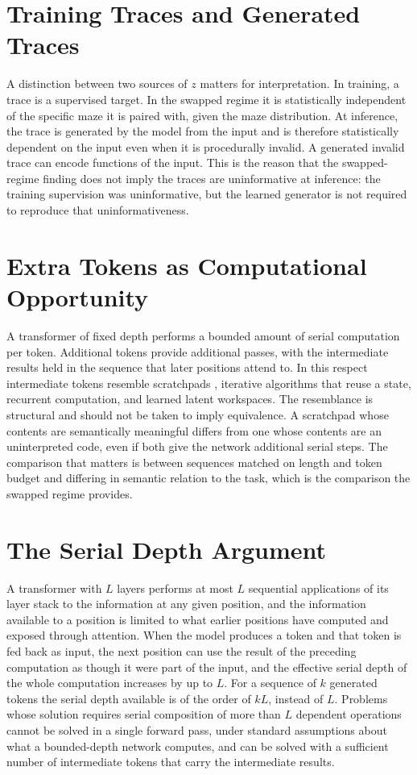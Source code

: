 \section{Training Traces and Generated Traces}

A distinction between two sources of $z$ matters for interpretation. In training, a trace is a supervised target. In the swapped regime it is statistically independent of the specific maze it is paired with, given the maze distribution. At inference, the trace is generated by the model from the input and is therefore statistically dependent on the input even when it is procedurally invalid. A generated invalid trace can encode functions of the input. This is the reason that the swapped-regime finding does not imply the traces are uninformative at inference: the training supervision was uninformative, but the learned generator is not required to reproduce that uninformativeness.

\section{Extra Tokens as Computational Opportunity}

A transformer of fixed depth performs a bounded amount of serial computation per token. Additional tokens provide additional passes, with the intermediate results held in the sequence that later positions attend to. In this respect intermediate tokens resemble scratchpads \cite{nye2021}, iterative algorithms that reuse a state, recurrent computation, and learned latent workspaces. The resemblance is structural and should not be taken to imply equivalence. A scratchpad whose contents are semantically meaningful differs from one whose contents are an uninterpreted code, even if both give the network additional serial steps. The comparison that matters is between sequences matched on length and token budget and differing in semantic relation to the task, which is the comparison the swapped regime provides.

\section{The Serial Depth Argument}

A transformer with $L$ layers performs at most $L$ sequential applications of its layer stack to the information at any given position, and the information available to a position is limited to what earlier positions have computed and exposed through attention. When the model produces a token and that token is fed back as input, the next position can use the result of the preceding computation as though it were part of the input, and the effective serial depth of the whole computation increases by up to $L$. For a sequence of $k$ generated tokens the serial depth available is of the order of $kL$, instead of $L$. Problems whose solution requires serial composition of more than $L$ dependent operations cannot be solved in a single forward pass, under standard assumptions about what a bounded-depth network computes, and can be solved with a sufficient number of intermediate tokens that carry the intermediate results.

